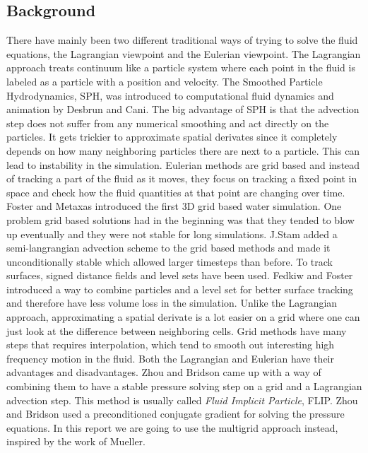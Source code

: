 \subsection{Background}

There have mainly been two different traditional ways of trying to solve the fluid equations, the Lagrangian viewpoint and the Eulerian viewpoint. The Lagrangian approach treats continuum like a particle system where each point in the fluid is labeled as a particle with a position and velocity. The Smoothed Particle Hydrodynamics\cite{sph}, SPH, was introduced to computational fluid dynamics and animation by Desbrun and Cani\cite{desbrun}. The big advantage of SPH is that the advection step does not suffer from any numerical smoothing and act directly on the particles. It gets trickier to approximate spatial derivates since it completely depends on how many neighboring particles there are next to a particle. This can lead to instability in the simulation. Eulerian methods are grid based and instead of tracking a part of the fluid as it moves, they focus on tracking a fixed point in space and check how the fluid quantities at that point are changing over time. Foster and Metaxas\cite{metaxas} introduced the first 3D grid based water simulation. One problem grid based solutions had in the beginning was that they tended to blow up eventually and they were not stable for long simulations. J.Stam\cite{stam} added a semi-langrangian advection scheme to the grid based methods and made it unconditionally stable which allowed larger timesteps than before. To track surfaces, signed distance fields and level sets have been used. Fedkiw and Foster\cite{fosterfed} introduced a way to combine particles and a level set for better surface tracking and therefore have less volume loss in the simulation. Unlike the Lagrangian approach, approximating a spatial derivate is a lot easier on a grid where one can just look at the difference between neighboring cells. Grid methods have many steps that requires interpolation, which tend to smooth out interesting high frequency motion in the fluid.
\newline
\newline
Both the Lagrangian and Eulerian have their advantages and disadvantages. Zhou and Bridson\cite{zhu} came up with a way of combining them to have a stable pressure solving step on a grid and a Lagrangian advection step. This method is usually called \emph{Fluid Implicit Particle}, FLIP. Zhou and Bridson used a preconditioned conjugate gradient for solving the pressure equations. In this report we are going to use the multigrid approach instead, inspired by the work of Mueller\cite{mueller}.
